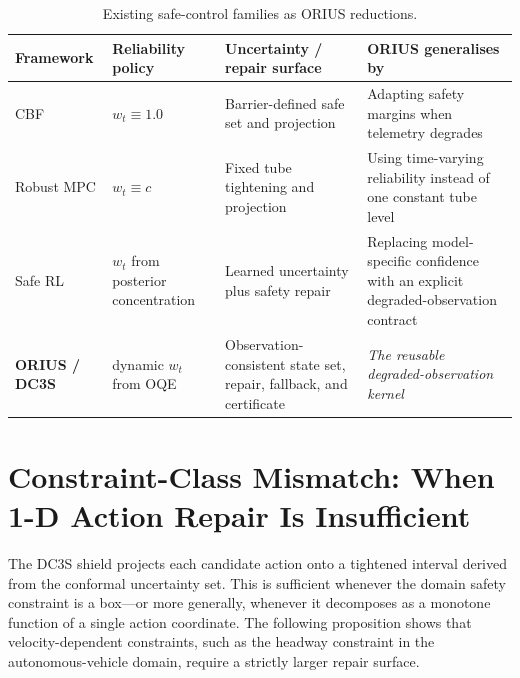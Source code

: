 \begin{table}[htbp]
\centering
\caption{Existing safe-control families as ORIUS reductions.}
\label{tab:unification-comparison}
\begin{tabular}{p{2.8cm}p{2.8cm}p{3.5cm}p{3.8cm}}
\toprule
\textbf{Framework} & \textbf{Reliability policy} & \textbf{Uncertainty / repair surface} & \textbf{ORIUS generalises by} \\
\midrule
CBF & $w_t \equiv 1.0$ & Barrier-defined safe set and projection & Adapting safety margins when telemetry degrades \\
\addlinespace
Robust MPC & $w_t \equiv c$ & Fixed tube tightening and projection & Using time-varying reliability instead of one constant tube level \\
\addlinespace
Safe RL & $w_t$ from posterior concentration & Learned uncertainty plus safety repair & Replacing model-specific confidence with an explicit degraded-observation contract \\
\addlinespace
\textbf{ORIUS / DC3S} & dynamic $w_t$ from OQE & Observation-consistent state set, repair, fallback, and certificate & \textit{The reusable degraded-observation kernel} \\
\bottomrule
\end{tabular}
\end{table}

\section{Constraint-Class Mismatch: When 1-D Action Repair Is Insufficient}
\label{sec:constraint-class-mismatch}

The DC3S shield projects each candidate action onto a tightened interval
derived from the conformal uncertainty set.  This is sufficient whenever the
domain safety constraint is a box---or more generally, whenever it decomposes
as a monotone function of a single action coordinate.  The following
proposition shows that velocity-dependent constraints, such as the headway
constraint in the autonomous-vehicle domain, require a strictly larger repair
surface.

